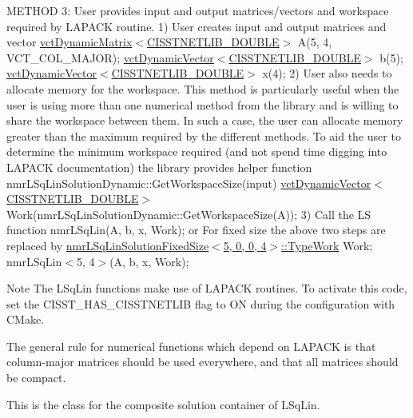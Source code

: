 M\-E\-T\-H\-O\-D 3\-: User provides input and output matrices/vectors and workspace required by L\-A\-P\-A\-C\-K routine. 1) User creates input and output matrices and vector \hyperlink{classvct_dynamic_matrix}{vct\-Dynamic\-Matrix$<$\-C\-I\-S\-S\-T\-N\-E\-T\-L\-I\-B\-\_\-\-D\-O\-U\-B\-L\-E$>$} A(5, 4, V\-C\-T\-\_\-\-C\-O\-L\-\_\-\-M\-A\-J\-O\-R); \hyperlink{classvct_dynamic_vector}{vct\-Dynamic\-Vector$<$\-C\-I\-S\-S\-T\-N\-E\-T\-L\-I\-B\-\_\-\-D\-O\-U\-B\-L\-E$>$} b(5); \hyperlink{classvct_dynamic_vector}{vct\-Dynamic\-Vector$<$\-C\-I\-S\-S\-T\-N\-E\-T\-L\-I\-B\-\_\-\-D\-O\-U\-B\-L\-E$>$} x(4); 2) User also needs to allocate memory for the workspace. This method is particularly useful when the user is using more than one numerical method from the library and is willing to share the workspace between them. In such a case, the user can allocate memory greater than the maximum required by the different methods. To aid the user to determine the minimum workspace required (and not spend time digging into L\-A\-P\-A\-C\-K documentation) the library provides helper function nmr\-L\-Sq\-Lin\-Solution\-Dynamic\-::\-Get\-Workspace\-Size(input) \hyperlink{classvct_dynamic_vector}{vct\-Dynamic\-Vector$<$\-C\-I\-S\-S\-T\-N\-E\-T\-L\-I\-B\-\_\-\-D\-O\-U\-B\-L\-E$>$} Work(nmr\-L\-Sq\-Lin\-Solution\-Dynamic\-::\-Get\-Workspace\-Size(\-A)); 3) Call the L\-S function nmr\-L\-Sq\-Lin(\-A, b, x, Work); or For fixed size the above two steps are replaced by \hyperlink{classnmr_l_sq_lin_solution_fixed_size_a2804f3b3815a82a0f9655bcd2f86e7e4}{nmr\-L\-Sq\-Lin\-Solution\-Fixed\-Size$<$5, 0, 0, 4$>$\-::\-Type\-Work} Work; nmr\-L\-Sq\-Lin$<$5, 4$>$(\-A, b, x, Work);

\begin{DoxyNote}{Note}
The L\-Sq\-Lin functions make use of L\-A\-P\-A\-C\-K routines. To activate this code, set the C\-I\-S\-S\-T\-\_\-\-H\-A\-S\-\_\-\-C\-I\-S\-S\-T\-N\-E\-T\-L\-I\-B flag to O\-N during the configuration with C\-Make. 

The general rule for numerical functions which depend on L\-A\-P\-A\-C\-K is that column-\/major matrices should be used everywhere, and that all matrices should be compact.
\end{DoxyNote}
This is the class for the composite solution container of L\-Sq\-Lin. 

